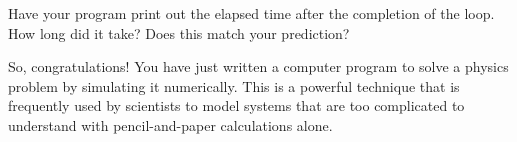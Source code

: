 \documentclass[11pt]{article}
\begin{document}
Have your program print out the elapsed time after the completion of the
loop.  How long did it take?  Does this match your prediction?

So, congratulations!  You have just written a computer program to solve
a physics problem by simulating it numerically.  This is a powerful technique 
that is frequently used by scientists to model systems that are too 
complicated to understand with pencil-and-paper calculations alone.
\end{document}
